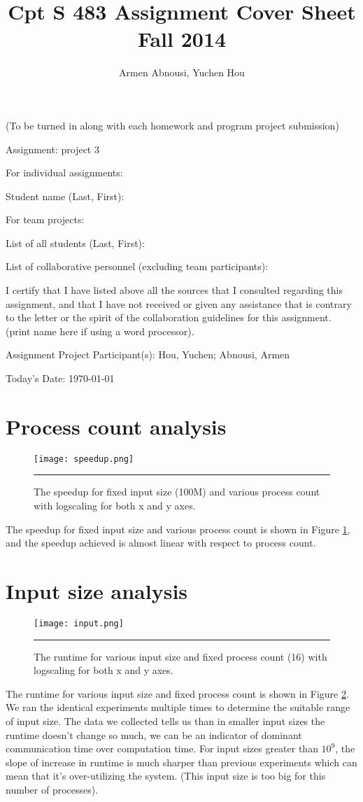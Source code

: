 \documentclass[12pt]{article}
\begin{document}
\title{Cpt S 483 Assignment Cover Sheet \\ Fall 2014
}
\author{Armen Abnousi, Yuchen Hou}
\maketitle

(To be turned in along with each homework and program project submission)

Assignment: project 3

For individual assignments:

Student name (Last, First):

For team projects:

List of all students (Last, First):

List of collaborative personnel (excluding team participants):

I certify that I have listed above all the sources that I consulted regarding this assignment, and that I have not received or given any assistance that is contrary to the letter or the spirit of the collaboration guidelines for this assignment. (print name here if using a word processor).

Assignment Project Participant(s): Hou, Yuchen; Abnousi, Armen

Today's Date: \today

\pagebreak

\section{Process count analysis}
\begin{figure}[htb]
  \centering
      {\texttt{[image: speedup.png]}} \rule{1\linewidth}{1pt}
      \caption{The speedup for fixed input size (100M) and various process count with logscaling for both x and y axes.}
      \label{fig:process}
\end{figure}
The speedup for fixed input size and various process count is shown in Figure \ref{fig:process}, and the speedup achieved is almost linear with respect to process count.
\section{Input size analysis}
\begin{figure}[htb]
  \centering
      {\texttt{[image: input.png]}} \rule{1\linewidth}{1pt}
      \caption{The runtime for various input size and fixed process count (16) with logscaling for both x and y axes.}
      \label{fig:input}
\end{figure}
The runtime for various input size and fixed process count is shown in Figure \ref{fig:input}. We ran the identical experiments multiple times to determine the suitable range of input size. 
The data we collected tells us than in smaller input sizes the runtime doesn't change so much, we can be an indicator of dominant communication time over computation time.
For input sizes greater than $10^9$, the slope of increase in runtime is much sharper than previous experiments which can mean that it's over-utilizing the system. (This input size is too big for this number of processes).
\end{document}
